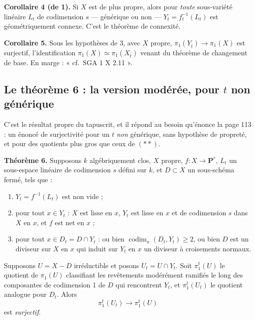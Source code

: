 \documentclass[11pt,a4paper]{article}
\begin{document}
\textbf{Corollaire 4 (de 1).} Si $X$ est de plus propre, alors pour
\emph{toute} sous-variété linéaire $L_{t}$ de codimension $s$ ---
générique ou non --- $Y_{t} = f_{t}^{-1}(L_{t})$ est géométriquement connexe.
C'est le théorème de connexité.

\textbf{Corollaire 5.} Sous les hypothèses de 3, avec $X$ propre,
$\pi_{1}(Y_{\bar{t}}) \to \pi_{1}(X)$ est surjectif, l'identification
$\pi_{1}(X) \simeq \pi_{1}(X_{\bar{t}})$ venant du théorème de changement de
base. En marge : « cf.\ SGA 1 X 2.11 ».

\subsection*{Le théorème 6 : la version modérée, pour $t$ non générique}

C'est le résultat propre du tapuscrit, et il répond au besoin qu'énonce la page
113 : un énoncé de surjectivité pour un $t$ \emph{non} générique, sans
hypothèse de propreté, et pour des quotients plus gros que ceux de
$(\ast\ast)$.

\textbf{Théorème 6.} Supposons $k$ algébriquement clos, $X$ propre,
$f : X \to \mathbf{P}^{r}$, $L_{t}$ un sous-espace linéaire de codimension $s$
défini sur $k$, et $D \subset X$ un sous-schéma fermé, tels que :

\begin{enumerate}
  \item[a)] $Y_{t} = f^{-1}(L_{t})$ est non vide ;
  \item[b)] pour tout $x \in Y_{t}$ : $X$ est lisse en $x$, $Y_{t}$ est lisse
    en $x$ et de codimension $s$ dans $X$ en $x$, et $f$ est net en $x$ ;
  \item[c)] pour tout $x \in D_{t} = D \cap Y_{t}$ : ou bien
    $\operatorname{codim}_{x}(D_{t}, Y_{t}) \geqslant 2$, ou bien $D$ est un
    diviseur sur $X$ en $x$ qui induit sur $Y_{t}$ en $x$ un diviseur à
    croisements normaux.
\end{enumerate}

Supposons $U = X - D$ irréductible et posons $U_{t} = U \cap Y_{t}$. Soit
$\pi^{t}_{1}(U)$ le quotient de $\pi_{1}(U)$ classifiant les revêtements
modérément ramifiés le long des composantes de codimension 1 de $D$ qui
rencontrent $Y_{t}$, et $\pi^{t}_{1}(U_{t})$ le quotient analogue pour
$D_{t}$. Alors
\[
  \pi^{t}_{1}(U_{t}) \longrightarrow \pi^{t}_{1}(U)
\]
est \emph{surjectif}.
\end{document}
